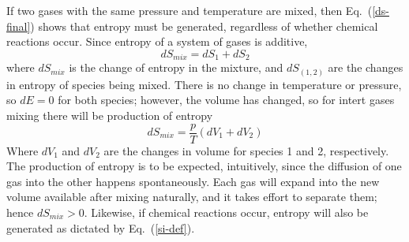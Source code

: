\documentclass[a4paper]{report}
\newcommand{\eref}[1]{Eq.~(\ref{#1})}
\begin{document}
\begin{enumerate}
    If two gases with the same pressure and temperature are mixed, then
    \eref{ds-final} shows that entropy must be generated, regardless of whether
    chemical reactions occur.  Since entropy of a system of gases is additive,
    \begin{equation}
      dS_{mix} = dS_1 + dS_2
      \label{s-additive}
    \end{equation}
    where $dS_{mix}$ is the change of entropy in the mixture, and $dS_{(1,2)}$
    are the changes in entropy of species being mixed.  There is no change in
    temperature or pressure, so $dE = 0$ for both species; however, the volume
    has changed, so for intert gases mixing there will be production of entropy
    \begin{equation}
      dS_{mix} = \frac{p}{T}\left( dV_1 + dV_2 \right)
      \label{smix-change}
    \end{equation}
    Where $dV_1$ and $dV_2$ are the changes in volume for species 1 and 2,
    respectively.  The production of entropy is to be expected, intuitively,
    since the diffusion of one gas into the other happens spontaneously.  Each
    gas will expand into the new volume available after mixing naturally, and it
    takes effort to separate them; hence $dS_{mix} > 0$.  Likewise, if chemical
    reactions occur, entropy will also be generated as dictated by
    \eref{si-def}.

\end{enumerate}
\end{document}
